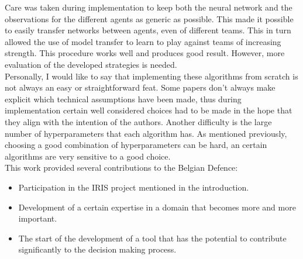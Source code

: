 Care was taken during implementation to keep both the neural network and the observations for the different agents as generic as possible. This made it possible to easily transfer networks between agents, even of different teams. This in turn allowed the use of model transfer to learn to play against teams of increasing strength. This procedure works well and produces good result. However, more evaluation of the developed strategies is needed.\\
Personally, I would like to say that implementing these algorithms from scratch is not always an easy or straightforward feat. Some papers don't always make explicit which technical assumptions have been made, thus during implementation certain well considered choices had to be made in the hope that they align with the intention of the authors. Another difficulty is the large number of hyperparameters that each algorithm has. As mentioned previously, choosing a good combination of hyperparameters can be hard, an certain algorithms are very sensitive to a good choice.\\
This work provided several contributions to the Belgian Defence:
\begin{itemize}
    \item Participation in the IRIS project mentioned in the introduction.
    \item Development of a certain expertise in a domain that becomes more and more important.
    \item The start of the development of a tool that has the potential to contribute significantly to the decision making process.
\end{itemize}
